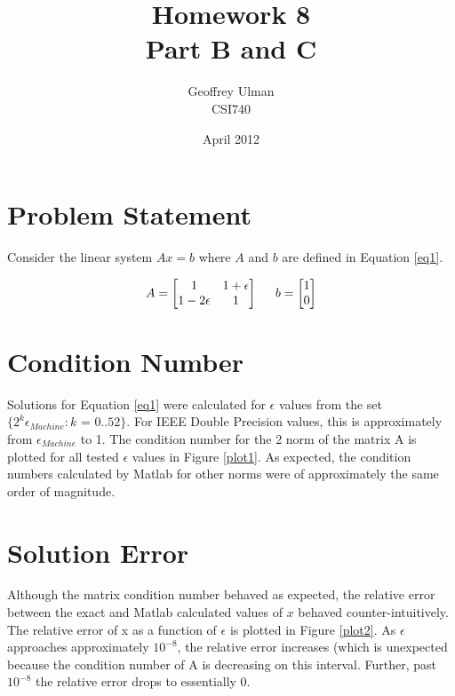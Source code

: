 \documentclass{article}
\begin{document}
\title{Homework 8\\
       Part B and C}
\author{Geoffrey Ulman\\
        CSI740}
\date{April 2012}
\maketitle

\section{Problem Statement}\label{prob}

Consider the linear system \(Ax=b\) where \(A\) and \(b\) are defined in Equation \ref{eq1}.

\begin{equation}
A =
  \begin{bmatrix}
    1 & 1 + \epsilon \\
    1 - 2\epsilon & 1 \\
  \end{bmatrix}
\hspace{.2in}
b = 
  \begin{bmatrix}
    1 \\
    0 \\
  \end{bmatrix}
\label{eq1}
\end{equation}

\section{Condition Number}\label{cond}

Solutions for Equation \ref{eq1} were calculated for \( \epsilon \) values from the set \( \{2^k\epsilon_{Machine}:\text{$k$ = 0..52}\} \). For IEEE Double Precision values, this is approximately from \( \epsilon_{Machine} \) to 1. The condition number for the 2 norm of the matrix A is plotted for all tested \( \epsilon \) values in Figure \ref{plot1}. As expected, the condition numbers calculated by Matlab for other norms were of approximately the same order of magnitude.

\section{Solution Error}\label{error}

Although the matrix condition number behaved as expected, the relative error between the exact and Matlab calculated values of \(x\) behaved counter-intuitively. The relative error of x as a function of \( \epsilon \) is plotted in Figure \ref{plot2}. As \( \epsilon \) approaches approximately \(10^{-8}\), the relative error increases (which is unexpected because the condition number of A is decreasing on this interval. Further, past \(10^{-8}\) the relative error drops to essentially 0.
\end{document}
